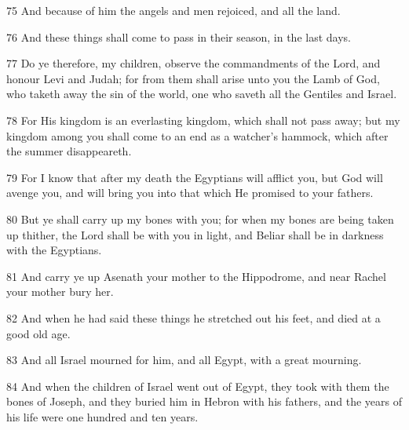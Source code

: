 \par 75 And because of him the angels and men rejoiced, and all the land.

\par 76 And these things shall come to pass in their season, in the last days.

\par 77 Do ye therefore, my children, observe the commandments of the Lord, and honour Levi and Judah; for from them shall arise unto you the Lamb of God, who taketh away the sin of the world, one who saveth all the Gentiles and Israel.

\par 78 For His kingdom is an everlasting kingdom, which shall not pass away; but my kingdom among you shall come to an end as a watcher's hammock, which after the summer disappeareth.

\par 79 For I know that after my death the Egyptians will afflict you, but God will avenge you, and will bring you into that which He promised to your fathers.

\par 80 But ye shall carry up my bones with you; for when my bones are being taken up thither, the Lord shall be with you in light, and Beliar shall be in darkness with the Egyptians.

\par 81 And carry ye up Asenath your mother to the Hippodrome, and near Rachel your mother bury her.

\par 82 And when he had said these things he stretched out his feet, and died at a good old age.

\par 83 And all Israel mourned for him, and all Egypt, with a great mourning.

\par 84 And when the children of Israel went out of Egypt, they took with them the bones of Joseph, and they buried him in Hebron with his fathers, and the years of his life were one hundred and ten years.





